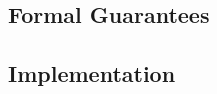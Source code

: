 

\subsection{Formal Guarantees}\label{sex:formal:guarantees}

\subsection{Implementation}\label{subsec:jsil:analysis:implementation}

%
%
%
